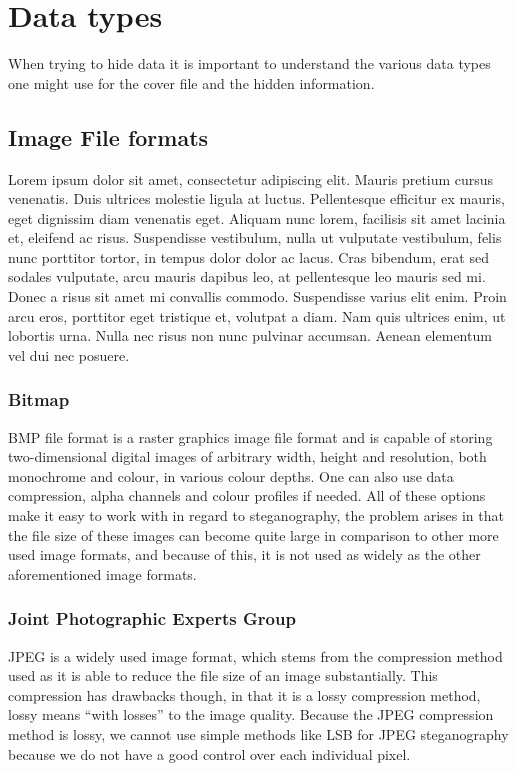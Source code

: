 \section{Data types}
When trying to hide data it is important to understand the various data types one might use for the cover file and the hidden information.

\subsection{Image File formats}
Lorem ipsum dolor sit amet, consectetur adipiscing elit. Mauris pretium cursus venenatis. Duis ultrices molestie ligula at luctus. Pellentesque efficitur ex mauris, eget dignissim diam venenatis eget. Aliquam nunc lorem, facilisis sit amet lacinia et, eleifend ac risus. Suspendisse vestibulum, nulla ut vulputate vestibulum, felis nunc porttitor tortor, in tempus dolor dolor ac lacus. Cras bibendum, erat sed sodales vulputate, arcu mauris dapibus leo, at pellentesque leo mauris sed mi. Donec a risus sit amet mi convallis commodo. Suspendisse varius elit enim. Proin arcu eros, porttitor eget tristique et, volutpat a diam. Nam quis ultrices enim, ut lobortis urna. Nulla nec risus non nunc pulvinar accumsan. Aenean elementum vel dui nec posuere.

\subsubsection*{Bitmap}
BMP file format is a raster graphics image file format and is capable of storing two-dimensional digital images of arbitrary width, height and resolution, both monochrome and colour, in various colour depths. 
One can also use data compression, alpha channels and colour profiles if needed.
All of these options make it easy to work with in regard to steganography, the problem arises in that the file size of these images can become quite large in comparison to other more used image formats, and because of this, it is not used as widely as the other aforementioned image formats.

\subsubsection*{Joint Photographic Experts Group}
JPEG is a widely used image format, which stems from the compression method used as it is able to reduce the file size of an image substantially.
This compression has drawbacks though, in that it is a lossy compression method, lossy means ``with losses'' to the image quality.
Because the JPEG compression method is lossy, we cannot use simple methods like LSB for JPEG steganography because we do not have a good control over each individual pixel.


